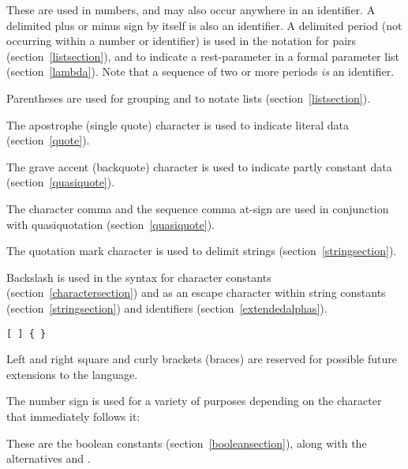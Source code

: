 \begin{description}{}{}

\item[{\tt.\ + -}]
These are used in numbers, and may also occur anywhere in an identifier.
A delimited plus or minus sign by itself
is also an identifier.
A delimited period (not occurring within a number or identifier) is used
in the notation for pairs (section~\ref{listsection}), and to indicate a
rest-parameter in a  formal parameter list (section~\ref{lambda}).
Note that a sequence of two or more periods {\em is} an identifier.

\item[\tt( )]
Parentheses are used for grouping and to notate lists
(section~\ref{listsection}).

\item[\singlequote]
The apostrophe (single quote) character is used to indicate literal data (section~\ref{quote}).

\item[\backquote]
The grave accent (backquote) character is used to indicate partly constant
data (section~\ref{quasiquote}).

\item[\tt, ,@]
The character comma and the sequence comma at-sign are used in conjunction
with quasiquotation (section~\ref{quasiquote}).

\item[\tt"]
The quotation mark character is used to delimit strings (section~\ref{stringsection}).

\item[\backwhack]
Backslash is used in the syntax for character constants
(section~\ref{charactersection}) and as an escape character within string
constants (section~\ref{stringsection}) and identifiers
(section~\ref{extendedalphas}).

\hbox{\tt \verb"[" \verb"]" \verb"{" \verb"}"}
\item[\copy0]
Left and right square and curly brackets (braces)
are reserved for possible future extensions to the language.

\item[\sharpsign] The number sign is used for a variety of purposes depending on
the character that immediately follows it:

\item[\schtrue{} \schfalse{}]
These are the boolean constants (section~\ref{booleansection}),
along with the alternatives  and .


\end{description}
